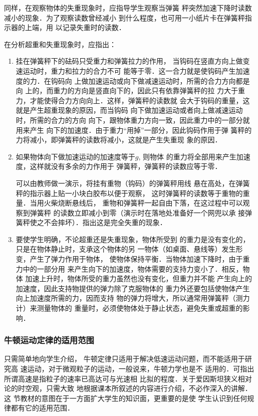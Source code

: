 同样，在观察物体的失重现象时，应指导学生观察当弹簧
秤突然加速下降时读数减小的现象．为了观察读数曾经减小
到什么程度，也可用一小纸片卡在弹簧秤指示器的上端，用
以记录失重时的读数．

在分析超重和失重现象时，应指出：

\begin{enumerate}
    \item 挂在弹簧秤下的砝码只受重力和弹簧拉力的作用，
当钩码在竖直方向上做变速运动时，重力和拉力的合力不可
能等于零．这一合力就是使钩码产生加速度的力．在钩码向
上做加速运动或向下做减速运动时，所需的合力方向都是向
上的，而重力的方向是竖直向下的，因此只有依靠弹簧秤的拉
力大于重力，才能使得合力方向向上．这样，弹簧秤的读数就
会大于钩码的重量，这就是产生超重现象的原因，而当钩码
向下做加速运动或者向上做减速运动时，所需的合力的方向
向下，跟物体重力方向一致，因此重力中的一部分就用来产生
向下的加速度．由于重力“用掉”一部分，因此钩码作用于弹
簧秤的力将减小，即弹簧秤的读数将减小，这就是产生失重现
象的原因．
\item 如果物体向下做加速运动的加速度等于$g$, 则物体
的重力将全部用来产生加速度，这样就没有多余的力作用于
弹簧秤，弹簧秤的读数应等于零．

可以由教师做一演示，将挂有重物（钩码）的弹簧秤用线
悬在高处，在弹簧秤的指示器上贴一小块白胶布以便于观察，
这时弹簧秤的读数等于重物的重量．当用火柴烧断悬线后，
重物和弹簧秤一起自由下落，在这过程中可以观察到弹簧秤
的读数立即减小到零（演示时在落地处准备好一个网兜以承
接弹簧秤使之不会摔坏）．指出这是完全失重的现象．

\item 要使学生明确，不论超重还是失重现象，物体所受到
的重力是没有变化的，只是在物体静止时，支承这个物体的另
一物体（如桌面、悬线等）发生形变，产生了弹力作用于物体，
使物体保持平衡．当物体加速下降时，由于重力中的一部分用
来产生向下的加速度，物体需要的支持力变小了．相反，物体
加速上升时，物体所受的重力虽然也没有变化，但重力并不能
产生向上的加速度，因此支持物提供的弹力除了克服物体的
重力外还要包括使物体产生向上加速度所需的力，因而支持
物的弹力将增大，所以通常用弹簧秤（测力计）来测量物体的
重量时，必须使物体处于静止状态，避免失重或超重的影响．
\end{enumerate}

\subsubsection{牛顿运动定律的适用范围}

只需简单地向学生介绍，
牛顿定律只适用于解决低速运动问题，而不能适用于研究高
速运动，对于微观粒子的运动，一般说来，牛顿力学也是不
适用的．可指出所谓高速是指粒子的速率已高达可与光速相
比拟的程度．关于爱因斯坦狭义相对论的时空观，只需大致
地根据课本所叙述的内容进行介绍，不必作深入的讲解．这
节教材的意图在于一方面扩大学生的知识面，更重要的是使
学生认识到任何规律都有它的适用范围．

